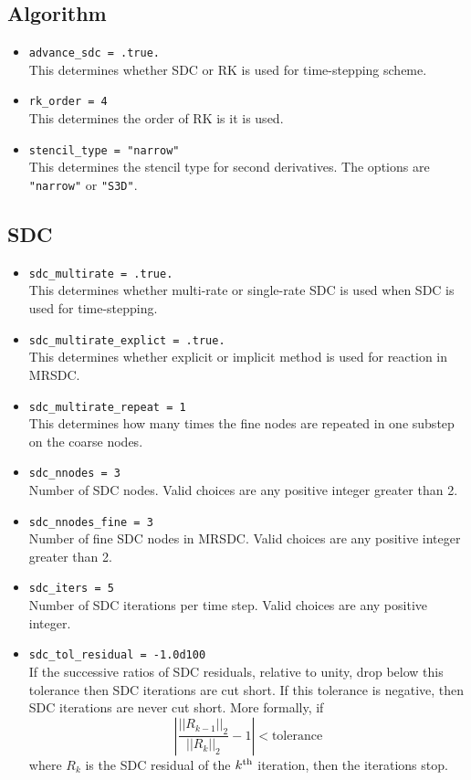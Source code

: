 \documentclass[11pt,letterpaper]{article}
\begin{document}
\subsection{Algorithm}

\begin{itemize}
\item {\tt advance\_sdc = .true.}\\
  This determines whether SDC or RK is used for time-stepping scheme.
\item {\tt rk\_order = 4}\\
  This determines the order of RK is it is used.
\item {\tt stencil\_type = "narrow"}\\
  This determines the stencil type for second derivatives.  The
  options are {\tt "narrow"} or {\tt "S3D"}. 
\end{itemize}

\subsection{SDC}

\begin{itemize}
\item {\tt sdc\_multirate = .true.}\\
  This determines whether multi-rate or single-rate SDC is used when
  SDC is used for time-stepping.
\item {\tt sdc\_multirate_explict = .true.}\\
  This determines whether explicit or implicit method is used for
  reaction in MRSDC.
\item {\tt sdc\_multirate_repeat = 1}\\
  This determines how many times the fine nodes are repeated in one
  substep on the coarse nodes.
\item {\tt sdc\_nnodes = 3}\\
  Number of SDC nodes.  Valid choices are any positive integer greater
  than 2.
\item {\tt sdc\_nnodes_fine = 3}\\
  Number of fine SDC nodes in MRSDC.  Valid choices are any positive
  integer greater than 2.
\item {\tt sdc\_iters = 5}\\
  Number of SDC iterations per time step.  Valid choices are any
  positive integer.
\item {\tt sdc\_tol\_residual = -1.0d100}\\
  If the successive ratios of SDC residuals, relative to unity, drop
  below this tolerance then SDC iterations are cut short.  If this
  tolerance is negative, then SDC iterations are never cut short.
  More formally, if
  \begin{equation*}
    \left| \frac{||R_{k-1}||_2}{||R_k||_2} - 1 \right| < \text{tolerance}
  \end{equation*}
  where $R_k$ is the SDC residual of the $k^{\rm th}$ iteration, then
  the iterations stop.
\end{itemize}
\end{document}
